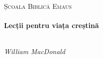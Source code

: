 
\begin{titlepage}
\begin{center}



\textsc{\LARGE Școala Biblică Emaus}\\[1.5cm]


\HRule \\[0.5cm]
{ \huge \bfseries Lecții pentru viața creștină}\\[0.4cm]

\HRule \\[1.5cm]

\begin{minipage}{0.4\textwidth}
\begin{flushleft} \large
\emph{William MacDonald}
\end{flushleft}
\end{minipage}
\begin{minipage}{0.4\textwidth}
\begin{flushright} \large
\end{flushright}
\end{minipage}

\vfill


\end{center}

\end{titlepage}
